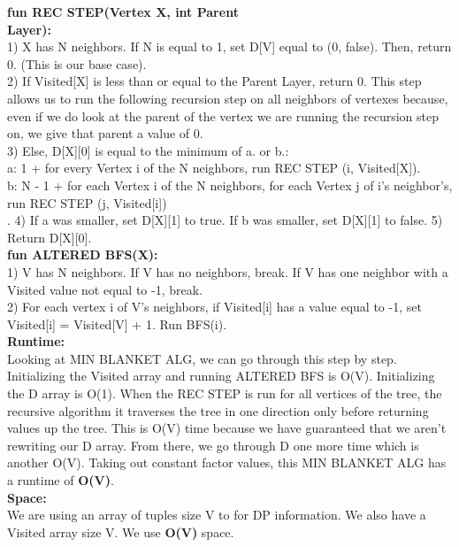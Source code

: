 \documentclass[11pt, solution, letterpaper]{format}
\begin{document}
\textbf{fun REC STEP(Vertex X, int Parent\\ Layer):}\\
1) X has N neighbors. If N is equal to 1, set D[V] equal to (0, false). Then, return 0. (This is our base case).\\
2) If Visited[X] is less than or equal to the Parent Layer, return 0. This step allows us to run the following recursion step on all neighbors of vertexes because, even if we do look at the parent of the vertex we are running the recursion step on, we give that parent a value of 0.\\
3) Else, D[X][0] is equal to the minimum of a. or b.:\\
a: 1 + for every Vertex i of the N neighbors, run REC STEP (i, Visited[X]).\\
b: N - 1 + for each Vertex i of the N neighbors, for each Vertex j of i's neighbor's, run REC STEP (j, Visited[i])\\.
4) If a was smaller, set D[X][1] to true. If b was smaller, set D[X][1] to false. 5) Return D[X][0].\\

\textbf{fun ALTERED BFS(X):}\\
1) V has N neighbors. If V has no neighbors, break. If V has one neighbor with a Visited value not equal to -1, break. \\
2) For each vertex i of V's neighbors, if Visited[i] has a value equal to -1, set Visited[i] = Visited[V] + 1. Run BFS(i). \\

\textbf{Runtime:}\\
Looking at MIN BLANKET ALG, we can go through this step by step. Initializing the Visited array and running ALTERED BFS is O(V). Initializing the D array is O(1). When the REC STEP is run for all vertices of the tree, the recursive algorithm it traverses the tree in one direction only before returning values up the tree. This is O(V) time because we have guaranteed that we aren't rewriting our D array. From there, we go through D one more time which is another O(V). Taking out constant factor values, this MIN BLANKET ALG has a runtime of \textbf{O(V)}.\\ 

\textbf{Space:}\\
We are using an array of tuples size V to for DP information. We also have a Visited array size V. We use \textbf{O(V)} space.\\ 
\end{document}
